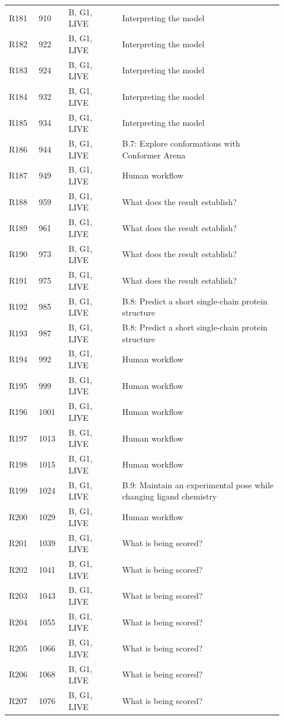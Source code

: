 \documentclass[11pt]{article}
\begin{document}
\begin{longtable}{@{}p{0.10\linewidth}p{0.10\linewidth}p{0.18\linewidth}p{0.54\linewidth}@{}}
R181 & 910 & B, G1, LIVE & Interpreting the model \\
R182 & 922 & B, G1, LIVE & Interpreting the model \\
R183 & 924 & B, G1, LIVE & Interpreting the model \\
R184 & 932 & B, G1, LIVE & Interpreting the model \\
R185 & 934 & B, G1, LIVE & Interpreting the model \\
R186 & 944 & B, G1, LIVE & B.7: Explore conformations with Conformer Arena \\
R187 & 949 & B, G1, LIVE & Human workflow \\
R188 & 959 & B, G1, LIVE & What does the result establish? \\
R189 & 961 & B, G1, LIVE & What does the result establish? \\
R190 & 973 & B, G1, LIVE & What does the result establish? \\
R191 & 975 & B, G1, LIVE & What does the result establish? \\
R192 & 985 & B, G1, LIVE & B.8: Predict a short single-chain protein structure \\
R193 & 987 & B, G1, LIVE & B.8: Predict a short single-chain protein structure \\
R194 & 992 & B, G1, LIVE & Human workflow \\
R195 & 999 & B, G1, LIVE & Human workflow \\
R196 & 1001 & B, G1, LIVE & Human workflow \\
R197 & 1013 & B, G1, LIVE & Human workflow \\
R198 & 1015 & B, G1, LIVE & Human workflow \\
R199 & 1024 & B, G1, LIVE & B.9: Maintain an experimental pose while changing ligand chemistry \\
R200 & 1029 & B, G1, LIVE & Human workflow \\
R201 & 1039 & B, G1, LIVE & What is being scored? \\
R202 & 1041 & B, G1, LIVE & What is being scored? \\
R203 & 1043 & B, G1, LIVE & What is being scored? \\
R204 & 1055 & B, G1, LIVE & What is being scored? \\
R205 & 1066 & B, G1, LIVE & What is being scored? \\
R206 & 1068 & B, G1, LIVE & What is being scored? \\
R207 & 1076 & B, G1, LIVE & What is being scored? \\

\end{longtable}
\end{document}
